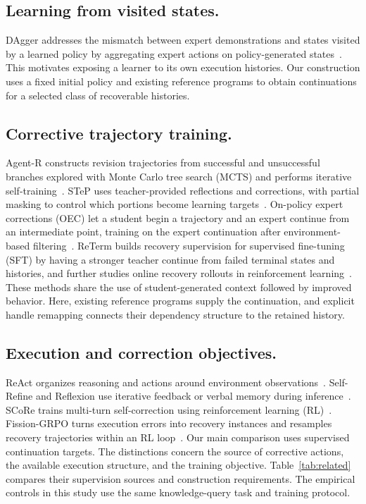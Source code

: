 \documentclass[runningheads]{llncs}
\begin{document}
\subsection{Learning from visited states.}
DAgger addresses the mismatch between expert demonstrations and states visited by a learned policy by aggregating expert actions on policy-generated states~\cite{ross2011dagger}. This motivates exposing a learner to its own execution histories. Our construction uses a fixed initial policy and existing reference programs to obtain continuations for a selected class of recoverable histories.

\subsection{Corrective trajectory training.}
Agent-R constructs revision trajectories from successful and unsuccessful branches explored with Monte Carlo tree search (MCTS) and performs iterative self-training~\cite{yuan2025agentr}. STeP uses teacher-provided reflections and corrections, with partial masking to control which portions become learning targets~\cite{chen2025step}. On-policy expert corrections (OEC) let a student begin a trajectory and an expert continue from an intermediate point, training on the expert continuation after environment-based filtering~\cite{lauffer2025oec}. ReTerm builds recovery supervision for supervised fine-tuning (SFT) by having a stronger teacher continue from failed terminal states and histories, and further studies online recovery rollouts in reinforcement learning~\cite{xie2026reterm}. These methods share the use of student-generated context followed by improved behavior. Here, existing reference programs supply the continuation, and explicit handle remapping connects their dependency structure to the retained history.

\subsection{Execution and correction objectives.}
ReAct organizes reasoning and actions around environment observations~\cite{yao2023react}. Self-Refine and Reflexion use iterative feedback or verbal memory during inference~\cite{madaan2023selfrefine,shinn2023reflexion}. SCoRe trains multi-turn self-correction using reinforcement learning (RL)~\cite{kumar2025score}. Fission-GRPO turns execution errors into recovery instances and resamples recovery trajectories within an RL loop~\cite{zhang2026fission}. Our main comparison uses supervised continuation targets. The distinctions concern the source of corrective actions, the available execution structure, and the training objective. Table~\ref{tab:related} compares their supervision sources and construction requirements. The empirical controls in this study use the same knowledge-query task and training protocol.
\end{document}
